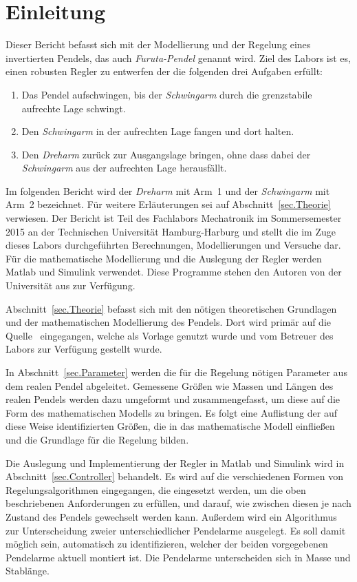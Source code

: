 \section{Einleitung}
\label{sec.Einleitung}

Dieser Bericht befasst sich mit der Modellierung und der Regelung eines invertierten Pendels, das auch \emph{Furuta-Pendel} genannt wird. 
Ziel des Labors ist es, einen robusten Regler zu entwerfen der die folgenden drei Aufgaben erfüllt:
\begin{enumerate}
	\raggedright
	\item Das Pendel aufschwingen, bis der \emph{Schwingarm} durch die grenzstabile aufrechte Lage schwingt.
	\item Den \emph{Schwingarm} in der aufrechten Lage fangen und dort halten.
	\item Den \emph{Dreharm} zurück zur Ausgangslage bringen, ohne dass dabei der \emph{Schwingarm} aus der aufrechten Lage herausfällt.
\end{enumerate}
Im folgenden Bericht wird der \emph{Dreharm} mit Arm~1 und der \emph{Schwingarm} mit Arm~2 bezeichnet.
Für weitere Erläuterungen sei auf Abschnitt~\ref{sec.Theorie} verwiesen.
Der Bericht ist Teil des Fachlabors Mechatronik im Sommersemester 2015 an der Technischen Universität Hamburg-Harburg und stellt die im Zuge dieses Labors durchgeführten Berechnungen, Modellierungen und Versuche dar. 
Für die mathematische Modellierung und die Auslegung der Regler werden Matlab und Simulink verwendet.
Diese Programme stehen den Autoren von der Universität aus zur Verfügung.

Abschnitt~\ref{sec.Theorie} befasst sich mit den nötigen theoretischen Grundlagen und der mathematischen Modellierung des Pendels.
Dort wird primär auf die Quelle~\citep{Cazzolato.2011} eingegangen, welche als Vorlage genutzt wurde und vom Betreuer des Labors zur Verfügung gestellt wurde.

In Abschnitt~\ref{sec.Parameter} werden die für die Regelung nötigen Parameter aus dem realen Pendel abgeleitet. 
Gemessene Größen wie Massen und Längen des realen Pendels werden dazu umgeformt und zusammengefasst, um diese auf die Form des mathematischen Modells zu bringen.
Es folgt eine Auflistung der auf diese Weise identifizierten Größen, die in das mathematische Modell einfließen und die Grundlage für die Regelung bilden.

Die Auslegung und Implementierung der Regler in Matlab und Simulink wird in Abschnitt~\ref{sec.Controller} behandelt.
Es wird auf die verschiedenen Formen von Regelungsalgorithmen eingegangen, die eingesetzt werden, um die oben beschriebenen Anforderungen zu erfüllen, und darauf, wie zwischen diesen je nach Zustand des Pendels gewechselt werden kann.
Außerdem wird ein Algorithmus zur Unterscheidung zweier unterschiedlicher Pendelarme ausgelegt. 
Es soll damit möglich sein, automatisch zu identifizieren, welcher der beiden vorgegebenen Pendelarme aktuell montiert ist. 
Die Pendelarme unterscheiden sich in Masse und Stablänge.

